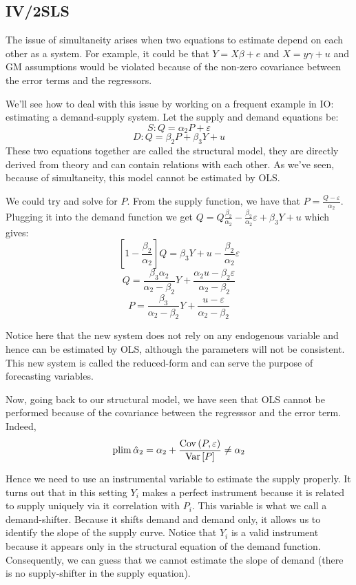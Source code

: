 \subsection{IV/2SLS}

The issue of simultaneity arises when two equations to estimate depend on each other as a system. For example, it could be that $Y = X\beta + e$ and $X = y\gamma + u$ and GM assumptions would be violated because of the non-zero covariance between the error terms and the regressors.

We'll see how to deal with this issue by working on a frequent example in IO: estimating a demand-supply system. Let the supply and demand equations be: $$S : Q = \alpha_2 P + \varepsilon $$ $$D: Q = \beta_2 P + \beta_3 Y + u $$ These two equations together are called the structural model, they are directly derived from theory and can contain relations with each other. As we've seen, because of simultaneity, this model cannot be estimated by OLS.

We could try and solve for $P$. From the supply function, we have that $P = \frac{Q - \varepsilon}{\alpha_2} $. Plugging it into the demand function we get $Q = Q \frac{\beta_2}{\alpha_2} - \frac{\beta_2}{\alpha_2}\varepsilon + \beta_3 Y + u$ which gives: $$\left[1 - \frac{\beta_2}{\alpha_2}\right]Q = \beta_3 Y + u - \frac{\beta_2}{\alpha_2}\varepsilon $$ $$ Q = \frac{\beta_3\alpha_2}{\alpha_2 - \beta_2} Y + \frac{\alpha_2 u -\beta_2\varepsilon}{\alpha_2 - \beta_2} $$ $$P = \frac{\beta_3}{\alpha_2 - \beta_2} Y + \frac{ u - \varepsilon}{\alpha_2 - \beta_2}$$ 

Notice here that the new system does not rely on any endogenous variable and hence can be estimated by OLS, although the parameters will not be consistent. This new system is called the reduced-form and can serve the purpose of forecasting variables.

Now, going back to our structural model, we have seen that OLS cannot be performed because of the covariance between the regresssor and the error term. Indeed, $$\operatorname{plim} \hat \alpha_2 = \alpha_2 + \frac{\operatorname{Cov}\left(P,\varepsilon\right)}{\operatorname{Var}\left[P\right]} \neq \alpha_2 $$

Hence we need to use an instrumental variable to estimate the supply properly. It turns out that in this setting $Y_i$ makes a perfect instrument because it is related to supply uniquely via it correlation with $P_i$. This variable is what we call a demand-shifter. Because it shifts demand and demand only, it allows us to identify the slope of the supply curve. Notice that $Y_i$ is a valid instrument because it appears only in the structural equation of the demand function. Consequently, we can guess that we cannot estimate the slope of demand (there is no supply-shifter in the supply equation).


